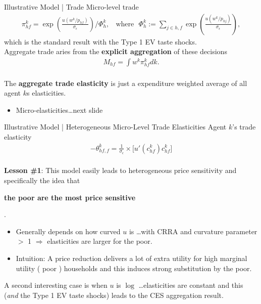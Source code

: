\documentclass[9pt,pdftex,aspectratio=1610]{beamer}
\theoremstyle{definition}
\begin{document}

\begin{frame}[t]{Illustrative Model | Trade}
\smallskip
Micro-level trade
\begin{align*}
\pi_{hf}^k = \exp \left( \frac{ u( w^k / p_{hf} ) }{\sigma_{\epsilon}} \right) \Bigg / \Phi_{h}^k, \ \ \ \ \mbox{where} \ \ \ \Phi_{h}^k := \sum_{j\in {h,f}} \exp \left( \frac{ u( w^k / p_{hj} )  }{\sigma_{\epsilon}} \right),
\end{align*}
which is the standard result with the Type 1 EV taste shocks.\\
\bigskip
\medskip
Aggregate trade aries from the \textbf{explicit aggregation} of these decisions
\begin{align*}
M_{hf} = \int w^k \pi_{hf}^k dk.
\end{align*}\\
\bigskip
The \textbf{aggregate trade elasticity} is just a expenditure weighted average of all agent $k$s elasticities.
\begin{itemize}
\smallskip
\item Micro-elasticities\ldots next slide
\end{itemize}
\end{frame}


\begin{frame}[t]{Illustrative Model | Heterogeneous Micro-Level Trade Elasticities}
\smallskip
Agent $k$'s trade elasticity
\begin{align*}
-\theta_{hf,f}^k = \frac{1}{\sigma_{\epsilon}} \times \bigg[ u'( c_{hf}^k )c_{hf}^k \bigg]
\end{align*}\\
\bigskip
\textbf{Lesson \#1}: This model easily leads to heterogeneous price sensitivity and specifically the idea that \begin{alert}{\textbf{the poor are the most price sensitive}}\end{alert}.
\begin{itemize}
\smallskip
\item Generally depends on how curved $u$ is \ldots with CRRA and curvature parameter $>$ 1 $\Rightarrow$ elasticities are larger for the poor.
\smallskip
\item Intuition: A price reduction delivers a lot of extra utility for high marginal utility ( poor ) households and this induces strong substitution by the poor.
\end{itemize}
\bigskip
A second interesting case is when $u$ is $\log$ \ldots elasticities are constant and this (\emph{and} the Type 1 EV taste shocks) leads to the {\small \citet{anderson1987ces}} CES aggregation result.
\end{frame}
\end{document}
